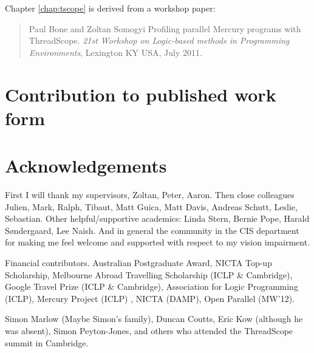 \documentclass[a4paper,twoside]{report}
\begin{document}

Chapter \ref{chap:tscope} is derived from a workshop paper:

\begin{quote}
Paul Bone and Zoltan Somogyi
Profiling parallel Mercury programs with ThreadScope.
{\em 21st Workshop on Logic-based methods in Programming Environments},
Lexington KY USA, July 2011.
\end{quote}


\chapter*{Contribution to published work form}


\chapter*{Acknowledgements}


First I will thank my supervisors,
Zoltan,
Peter,
Aaron.
Then close colleagues
Julien, 
Mark, 
Ralph, 
Tibaut,
Matt Guica,
Matt Davis,
Andreas Schutt,
Leslie,
Sebastian.
Other helpful/supportive academics:
Linda Stern,
Bernie Pope,
Harald S{\o}ndergaard,
Lee Naish.
And in general the community in the CIS department for making me feel
welcome and supported with respect to my vision impairment.

Financial contributors.
Australian Postgraduate Award,
NICTA Top-up Scholarship,
Melbourne Abroad Travelling Scholarship (ICLP \& Cambridge),
Google Travel Prize (ICLP \& Cambridge),
Association for Logic Programming (ICLP),
Mercury Project (ICLP) ,
NICTA (DAMP),
Open Parallel (MW'12).

Simon Marlow (Maybe Simon's family),
Duncan Coutts,
Eric Kow (although he was absent),
Simon Peyton-Jones,
and others who attended the ThreadScope summit in Cambridge.
\end{document}
